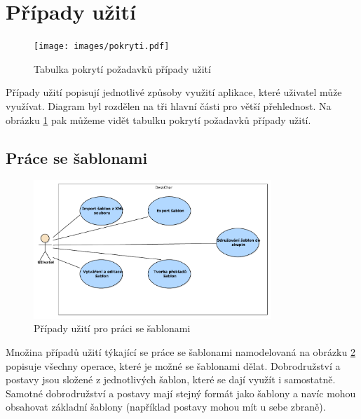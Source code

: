 \documentclass[thesis=B,czech]{resources/FITthesis}[2012/06/26]
\begin{document}
	\section{Případy užití}	
	\label{part:usecase}
	\begin{figure}\centering
		\texttt{[image: images/pokryti.pdf]}
		\caption[Tabulka pokrytí požadavků případy užití]{Tabulka pokrytí požadavků případy užití}
		\label{fig:pokryti}
	\end{figure}
Případy užití popisují jednotlivé způsoby využití aplikace, které uživatel může využívat. Diagram byl rozdělen na tři hlavní části pro větší přehlednost. Na obrázku \ref{fig:pokryti} pak můžeme vidět tabulku pokrytí požadavků případy užití.

\subsection{Práce se šablonami}
	\begin{figure}\centering
		\includegraphics[width=0.8\textwidth]{images/usecase-sablony.pdf}
		\caption[Případy užití pro šablony]{Případy užití pro práci se šablonami}			\label{fig:uc_sablony}
	\end{figure}

Množina případů užití týkající se práce se šablonami namodelovaná na obrázku \ref{fig:uc_sablony} popisuje všechny operace, které je možné se šablonami dělat. Dobrodružství a postavy jsou složené z jednotlivých šablon, které se dají využít i samostatně. Samotné dobrodružství a postavy mají stejný formát jako šablony a navíc mohou obsahovat základní šablony (například postavy mohou mít u sebe zbraně).
\end{document}
